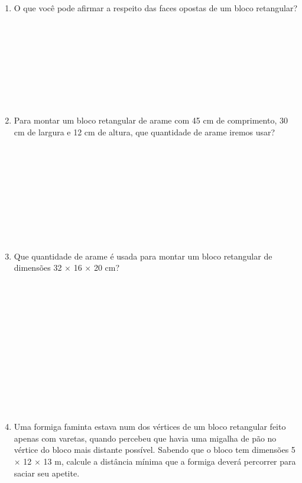 \documentclass[a4paper,14pt]{article}
\begin{document}
\begin{multicols}{2}
\begin{enumerate}
			\item O que você pode afirmar a respeito das faces opostas de um bloco retangular? \\\\\\\\\\\\\\\\\\
			\item Para montar um bloco retangular de arame com 45 cm de comprimento, 30 cm de largura e 12 cm de altura, que quantidade de arame iremos usar? \\\\\\\\\\\\\\\\\\\\
			\item Que quantidade de arame é usada para montar um bloco retangular de dimensões 32 $\times$ 16 $\times$ 20 cm? \\\\\\\\\\\\\\\\\\\\\\\\\\
			\item Uma formiga faminta estava num dos vértices de um bloco retangular feito apenas com varetas, quando percebeu que havia uma migalha de pão no vértice do bloco mais distante possível. Sabendo que o bloco tem dimensões 5 $\times$ 12 $\times$ 13 m, calcule a distância mínima que a formiga deverá percorrer para saciar seu apetite. \\\\\\\\\\\\\\\\\\\\\\\\

\end{enumerate}
\end{multicols}
\end{document}
